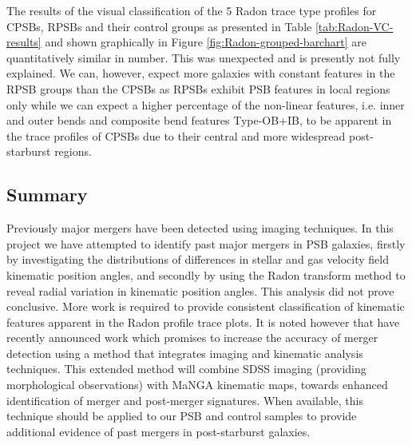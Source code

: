 The results of the visual classification of the 5 Radon trace type profiles for CPSBs, RPSBs and their control groups as presented in Table \ref{tab:Radon-VC-results} and shown graphically in Figure \ref{fig:Radon-grouped-barchart} are quantitatively similar in number. This was unexpected and is presently not fully explained. We can, however, expect more galaxies with constant features in the RPSB groups than the CPSBs as RPSBs exhibit PSB features in local regions only while we can expect a higher percentage of the non-linear features, i.e. inner and outer bends and composite bend features Type-OB+IB, to be apparent in the trace profiles of CPSBs due to their central and more widespread post-starburst regions. 

\subsection{Summary}
\label{summary}
Previously major mergers have been detected using imaging techniques. In this project we have attempted to identify past major mergers in PSB galaxies, firstly by investigating the distributions of differences in stellar and gas velocity field kinematic position angles, and secondly by using the Radon transform method to reveal radial variation in kinematic position angles. This analysis did not prove conclusive. More work is required to provide consistent classification of kinematic features apparent in the Radon profile trace plots. It is noted however that \cite{2019DDA....5020304N} have recently announced work which promises to increase the accuracy of merger detection using a method that integrates imaging and kinematic analysis techniques. This extended method will combine SDSS imaging (providing morphological observations) with MaNGA  kinematic maps, towards enhanced identification of merger and post-merger signatures. When available, this technique should be applied to our PSB and control samples to provide additional evidence of past mergers in post-starburst galaxies.

